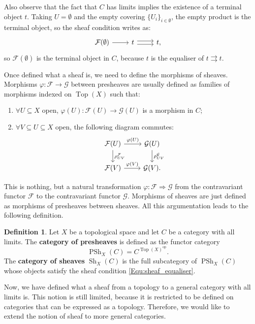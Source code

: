 \documentclass{report}
\DeclareMathOperator{\Top}{Top}
\DeclareMathOperator{\PSh}{PSh}
\DeclareMathOperator{\Sh}{Sh}
\theoremstyle{definition}
\newtheorem{definition}[theorem]{Definition}
\begin{document}
Also observe that the fact that $C$ has limits implies the existence of a terminal object $t$. Taking $U=\emptyset$ and the empty covering $\{U_i\}_{i\in\emptyset}$, the empty product is the terminal object, so the sheaf condition writes as:
\[
\begin{tikzcd}
\mathcal{F}(\emptyset)\arrow[r]&t\arrow[r,shift left]\arrow[r,shift right]&t,
\end{tikzcd}
\]
so $\mathcal{F}(\emptyset)$ is the terminal object in $C$, because $t$ is the equaliser of $t\rightrightarrows t$.
\vspace{2mm}

Once defined what a sheaf is, we need to define the morphisms of sheaves. Morphisms $\varphi:\mathcal{F}\rightarrow\mathcal{G}$ between presheaves are usually defined as families of morphisms indexed on $\Top(X)$ such that:
\begin{enumerate}
\item $\forall U\subseteq X$ open, $\varphi(U):\mathcal{F}(U)\rightarrow\mathcal{G}(U)$ is a morphism in $C$;
\item $\forall V\subseteq U\subseteq X$ open, the following diagram commutes:
\[
\begin{tikzcd}
\mathcal{F}(U)\arrow[r,"\varphi(U)"]\arrow[d,"\rho_{UV}^{\mathcal{F}}"]&\mathcal{G}(U)\arrow[d,"\rho_{UV}^{\mathcal{G}}"]\\
\mathcal{F}(V)\arrow[r,"\varphi(V)"]&\mathcal{G}(V).
\end{tikzcd}
\]
\end{enumerate}

This is nothing, but a natural transformation $\varphi:\mathcal{F}\Rightarrow\mathcal{G}$ from the contravariant functor $\mathcal{F}$ to the contravariant functor $\mathcal{G}$. Morphisms of sheaves are just defined as morphisms of presheaves between sheaves. All this argumentation leads to the following definition.

\begin{definition}
Let $X$ be a topological space and let $C$ be a category with all limits. The \textbf{category of presheaves} is defined as the functor category
\[\PSh_X(C)=C^{\Top(X)^{\text{op}}}.\]
The \textbf{category of sheaves} $\Sh_X(C)$ is the full subcategory of $\PSh_X(C)$ whose objects satisfy the sheaf condition \eqref{Equ:sheaf_equaliser}.
\end{definition}
\vspace{2mm}

Now, we have defined what a sheaf from a topology to a general category with all limits is. This notion is still limited, because it is restricted to be defined on categories that can be expressed as a topology. Therefore, we would like to extend the notion of sheaf to more general categories.
\end{document}
